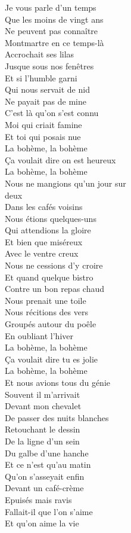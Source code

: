 \documentclass{novel}
\begin{document}
\begin{multicols}{2}
Je vous parle d'un temps \\
Que les moins de vingt ans \\
Ne peuvent pas connaître \\
Montmartre en ce temps-là \\
Accrochait ses lilas \\
Jusque sous nos fenêtres \\
Et si l'humble garni \\
Qui nous servait de nid \\
Ne payait pas de mine \\
C'est là qu'on s'est connu \\
Moi qui criait famine \\
Et toi qui posais nue \\

La bohème, la bohème \\
Ça voulait dire on est heureux \\
La bohème, la bohème \\
Nous ne mangions qu'un jour sur \\
deux \\

Dans les cafés voisins \\
Nous étions quelques-uns \\
Qui attendions la gloire \\
Et bien que miséreux \\
Avec le ventre creux \\
Nous ne cessions d'y croire \\
Et quand quelque bistro \\
Contre un bon repas chaud \\
Nous prenait une toile \\
Nous récitions des vers \\
Groupés autour du poêle \\
En oubliant l'hiver \\

La bohème, la bohème \\
Ça voulait dire tu es jolie \\
La bohème, la bohème \\
Et nous avions tous du génie \\

Souvent il m'arrivait \\
Devant mon chevalet \\
De passer des nuits blanches \\
Retouchant le dessin \\
De la ligne d'un sein \\
Du galbe d'une hanche \\
Et ce n'est qu'au matin \\
Qu'on s'asseyait enfin \\
Devant un café-crème \\
Epuisés mais ravis \\
Fallait-il que l'on s'aime \\
Et qu'on aime la vie \\


\end{multicols}
\end{document}
